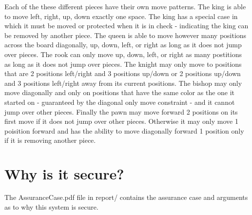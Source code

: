 \documentclass[12pt]{article}
\begin{document}
Each of the these different pieces have their own move patterns. The king is able to move left, right, up, down exactly one space. The king has a special case in which it must be moved or protected when it is in check - indicating the king can be removed by another piece. The queen is able to move however many positions across the board diagonally, up, down, left, or right as long as it does not jump over pieces. The rook can only move up, down, left, or right as many postitions as long as it does not jump over pieces. The knight may only move to positions that are 2 positions left/right and 3 positions up/down or 2 positions up/down and 3 positions left/right away from its current positions. The bishop may only move diagonally and only on positions that have the same color as the one it started on - guaranteed by the diagonal only move constraint - and it cannot jump over other pieces. Finally the pawn may move forward 2 positions on its first move if it does not jump over other pieces. Otherwise it may only move 1 poisition forward and has the ability to move diagonally forward 1 position only if it is removing another piece.

\section{Why is it secure?}
The AssuranceCase.pdf file in report/ contains the assurance case and arguments as to why this system is secure.
\end{document}
